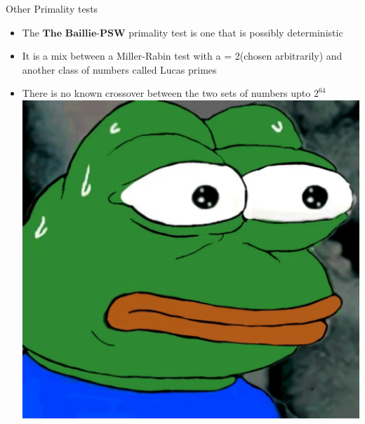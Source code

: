\documentclass{beamer}
\begin{document}
\begin{frame}{Other Primality tests}
    \begin{itemize}
        \item The $\textbf{The Baillie-PSW}$ primality test is one that is possibly deterministic
        \item It is a mix between a Miller-Rabin test with a = 2(chosen arbitrarily) and another class of numbers called Lucas primes
        \item There is no known crossover between the two sets of numbers upto $2^{64}$
        \includegraphics[width=\textwidth]{PepeSweat.pdf}
    \end{itemize}
\end{frame}
\end{document}

